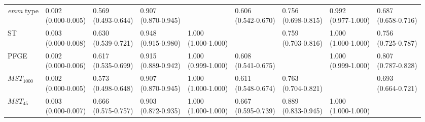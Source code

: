 \begin{table}[h!]
{\begin{threeparttable}[b]
\begin{tabular}{@{}lllllllll@{}}
        \textit{emm} type & \Centerstack{0.002 \\ (0.000-0.005)} & \Centerstack{0.569 \\ (0.493-0.644)} & \Centerstack{0.907 \\ (0.870-0.945)} & & \Centerstack{0.606 \\ (0.542-0.670)} & \Centerstack{0.756 \\ (0.698-0.815)} & \Centerstack{0.992 \\ (0.977-1.000)} & \Centerstack{0.687 \\ (0.658-0.716)} \\
        ST & \Centerstack{0.003 \\ (0.000-0.008)} & \Centerstack{0.630 \\ (0.539-0.721)} & \Centerstack{0.948 \\ (0.915-0.980)} & \Centerstack{1.000 \\ (1.000-1.000)} & & \Centerstack{0.759 \\ (0.703-0.816)} & \Centerstack{1.000 \\ (1.000-1.000)} & \Centerstack{0.756 \\ (0.725-0.787)} \\
        PFGE & \Centerstack{0.002 \\ (0.000-0.006)} & \Centerstack{0.617 \\ (0.535-0.699)} & \Centerstack{0.915 \\ (0.889-0.942)} & \Centerstack{1.000 \\ (0.999-1.000)} & \Centerstack{0.608 \\ (0.541-0.675)} & & \Centerstack{1.000 \\ (0.999-1.000)} & \Centerstack{0.807 \\ (0.787-0.828)} \\
        $MST_{1000}$ & \Centerstack{0.002 \\ (0.000-0.005)} & \Centerstack{0.573 \\ (0.498-0.648}) & \Centerstack{0.907 \\ (0.870-0.945)} & \Centerstack{1.000 \\ (1.000-1.000)} & \Centerstack{0.611 \\ (0.548-0.674)} & \Centerstack{0.763 \\ (0.704-0.821)} & & \Centerstack{0.693 \\ (0.664-0.721)} \\
        $MST_{45}$ & \Centerstack{0.003 \\ (0.000-0.007)} & \Centerstack{0.666 \\ (0.575-0.757)} & \Centerstack{0.903 \\ (0.872-0.935)} & \Centerstack{1.000 \\ (1.000-1.000)} & \Centerstack{0.667 \\ (0.595-0.739)} & \Centerstack{0.889 \\ (0.833-0.945)} & \Centerstack{1.000 \\ (1.000-1.000)} & \\

\end{tabular}
\end{threeparttable}}
\end{table}
